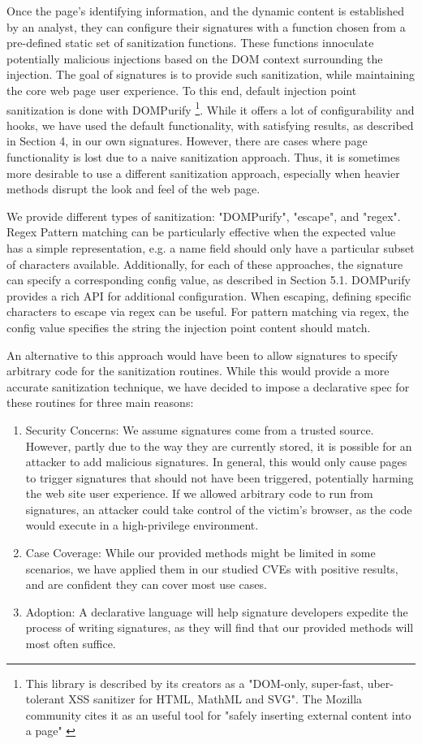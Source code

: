 Once the page's identifying information, and the dynamic content is established by an analyst, they can configure their signatures with a function chosen from a pre-defined static set of sanitization functions. These functions innoculate potentially malicious injections based on the DOM context surrounding the injection. The goal of signatures is to provide such sanitization, while maintaining the core web page user experience. To this end, default injection point sanitization is done with DOMPurify \cite{10.1007/978-3-319-66399-9_7} \footnote{This library is described by its creators as a "DOM-only, super-fast, uber-tolerant XSS sanitizer for HTML, MathML and SVG". The Mozilla community cites it as an useful tool for "safely inserting external content into a page" \cite{safecontent}}. While it offers a lot of configurability and hooks, we have used the default functionality, with satisfying results, as described in Section 4, in our own signatures. However, there are cases where page functionality is lost due to a naive sanitization approach. Thus, it is sometimes more desirable to use a different sanitization approach, especially when heavier methods disrupt the look and feel of the web page.
 
  We provide different types of sanitization: "DOMPurify", "escape", and "regex". Regex Pattern matching can be particularly effective when the expected value has a simple representation, e.g. a name field should only have a particular subset of characters available. Additionally, for each of these approaches, the signature can specify a corresponding config value, as described in Section 5.1. DOMPurify provides a rich API for additional configuration. When escaping, defining specific characters to escape via regex can be useful. For pattern matching via regex, the config value specifies the string the injection point content should match.
 
 An alternative to this approach would have been to allow signatures to specify arbitrary code for the sanitization routines. While this would provide a more accurate sanitization technique, we have decided to impose a declarative spec for these routines for three main reasons:
\begin{enumerate} 
	\item Security Concerns: We assume signatures come from a trusted source. However, partly due to the way they are currently stored, it is possible for an attacker to add malicious signatures. In general, this would only cause pages to trigger signatures that should not have been triggered, potentially harming the web site user experience. If we allowed arbitrary code to run from signatures, an attacker could take control of the victim's browser, as the code would execute in a high-privilege environment.
	\item Case Coverage: While our provided methods might be limited in some scenarios, we have applied them in our studied CVEs with positive results, and are confident they can cover most use cases.
	\item Adoption: A declarative language will help signature developers expedite the process of writing signatures, as they will find that our provided methods will most often suffice.
\end{enumerate}
 
